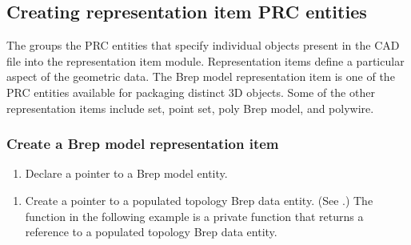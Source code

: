 \documentclass[letterpaper,12pt,english,openany,oneside]{sphinxmanual}
\begin{document}
\begin{sphinxVerbatim}[commandchars=\\\{\}]
    
\end{sphinxVerbatim}


\subsection{Creating representation item PRC entities}
\label{\detokenize{Plugins_A3D_API:creating-representation-item-prc-entities}}
The  groups the PRC entities that specify individual objects present in the CAD file into the representation item module. Representation items define a particular aspect of the geometric data. The Brep model representation item is one of the PRC entities available for packaging distinct 3D objects. Some of the other representation items include set, point set, poly Brep model, and polywire.


\subsubsection{Create a Brep model representation item}
\label{\detokenize{Plugins_A3D_API:create-a-brep-model-representation-item}}\begin{enumerate}
%
\item {} 
Declare a pointer to a Brep model entity.

\end{enumerate}

\begin{sphinxVerbatim}[commandchars=\\\{\}]
   
\end{sphinxVerbatim}
\begin{enumerate}
%
\setcounter{enumi}{1}
\item {} 
Create a pointer to a populated topology Brep data entity. (See .) The  function in the following example is a private function that returns a reference to a populated topology Brep data entity.

\end{enumerate}
\end{document}
